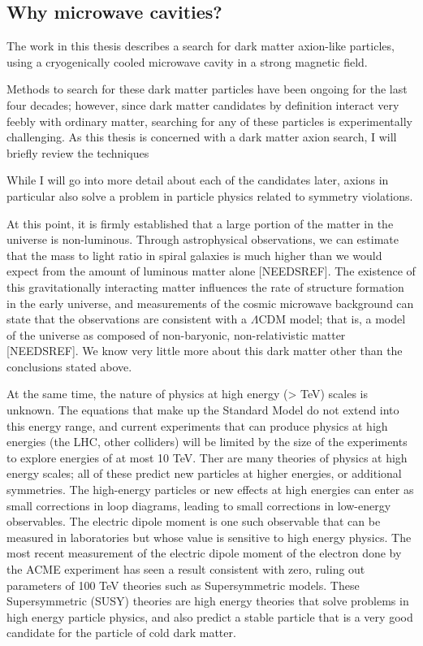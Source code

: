 \documentclass[12pt,twosides]{book}
\begin{document}
\subsection{Why microwave cavities?}
The work in this thesis describes a search for dark matter axion-like particles, using a cryogenically cooled microwave cavity in a strong magnetic field.



 Methods to search for these dark matter particles have been ongoing for the last four decades; however, since dark matter candidates by definition interact very feebly with ordinary matter, searching for any of these particles is experimentally challenging.  As this thesis is concerned with a dark matter axion search, I will briefly review the techniques



While I will go into more detail about each of the candidates later, axions in particular also solve a problem in particle physics related to symmetry violations. 




At this point, it is firmly established that a large portion of the matter in the universe is non-luminous. Through astrophysical observations, we can estimate that the mass to light ratio in spiral galaxies is much higher than we would expect from the amount of luminous matter alone [NEEDSREF]. The existence of this gravitationally interacting matter influences the rate of structure formation in the early universe, and measurements of the cosmic microwave background can state that the observations are consistent with a $\Lambda$CDM model; that is, a model of the universe as composed of non-baryonic, non-relativistic matter [NEEDSREF]. We know very little more about this dark matter other than the conclusions stated above.

At the same time, the nature of physics at high energy (> TeV) scales is unknown. The equations that make up the Standard Model do not extend into this energy range, and current experiments that can produce physics at high energies (the LHC, other colliders) will be limited by the size of the experiments to explore energies of at most 10 TeV. Ther are many theories of physics at high energy scales; all of these predict new particles at higher energies, or additional symmetries. The high-energy particles or new effects at high energies can enter as small corrections in loop diagrams, leading to small corrections in low-energy observables. The electric dipole moment is one such observable that can be measured in laboratories but whose value is sensitive to high energy physics. The most recent measurement of the electric dipole moment of the electron \cite{acme14} done by the ACME experiment has seen a result consistent with zero, ruling out parameters of 100 TeV theories such as Supersymmetric models. These Supersymmetric (SUSY) theories are high energy theories that solve problems in high energy particle physics, and also predict a stable particle that is a very good candidate for the particle of cold dark matter.
\end{document}
